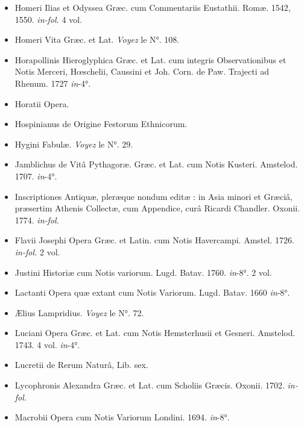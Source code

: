 \documentclass[a4paper, 18pt, oneside]{article}
\begin{document}
\begin{itemize}
    \item Homeri Ilias et Odyssea Græc. cum Commentariis Eustathii. Romæ. 1542, 1550. \emph{in-fol.} 4 vol.

    \item Homeri Vita Græc. et Lat. \emph{Voyez} le N°. 108.

    \item Horapollinis Hieroglyphica Græc. et Lat. cum integris Observationibus et Notis Merceri, Hœschelii, Caussini et Joh. Corn. de Paw. Trajecti ad Rhenum. 1727 \emph{in}-4°.

    \item Horatii Opera.

    \item Hospinianus de Origine Festorum Ethnicorum.

    \item Hygini Fabulæ. \emph{Voyez} le N°. 29.

    \item Jamblichus de Vitâ Pythagoræ. Græc. et Lat. cum Notis Kusteri. Amstelod. 1707. \emph{in}-4°.

    \item Inscriptiones Antiquæ, pleræque nondum editæ : in Asia minori et Græciâ, præsertim Athenis Collectæ, cum Appendice, curâ Ricardi Chandler. Oxonii. 1774. \emph{in-fol.}

    \item Flavii Josephi Opera Græc. et Latin. cum Notis Havercampi. Amstel. 1726. \emph{in-fol.} 2 vol.

    \item Justini Historiæ cum Notis variorum. Lugd. Batav. 1760. \emph{in}-8°. 2 vol.

    \item Lactanti Opera quæ extant cum Notis Variorum. Lugd. Batav. 1660 \emph{in}-8°.

    \item Ælius Lampridius. \emph{Voyez} le N°. 72.

    \item Luciani Opera Græc. et Lat. cum Notis Hemsterhusii et Gesneri. Amstelod. 1743. 4 vol. \emph{in}-4°.

    \item Lucretii de Rerum Naturâ, Lib. sex.

    \item Lycophronis Alexandra Græc. et Lat. cum Scholiis Græcis. Oxonii. 1702. \emph{in-fol.}

    \item Macrobii Opera cum Notis Variorum Londini. 1694. \emph{in}-8°.


\end{itemize}
\end{document}
